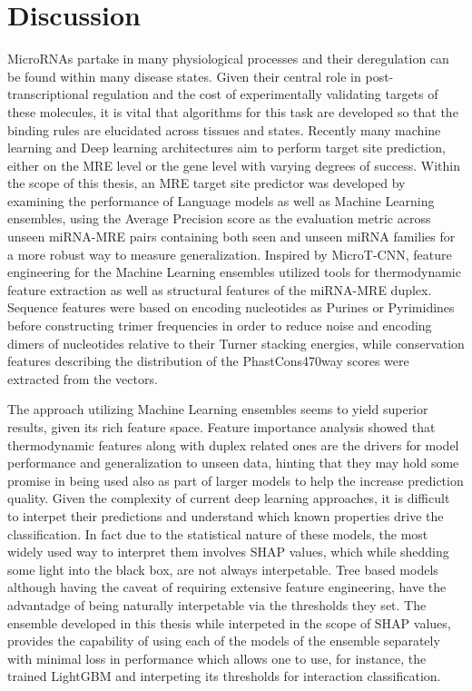 \documentclass[en,ack]{dimscthesis}
\begin{document}
\chapter{Discussion}
\par MicroRNAs partake in many physiological processes and their deregulation can be found within many disease states. Given their central role in post-transcriptional regulation and the cost of experimentally validating targets of these molecules, it is vital that algorithms for this task are developed so that the binding rules are elucidated across tissues and states. Recently many machine learning and Deep learning architectures aim to perform target site prediction, either on the MRE level or the gene level with varying degrees of success. Within the scope of this thesis, an MRE target site predictor was developed by examining the performance of Language models as well as Machine Learning ensembles, using the Average Precision score as the evaluation metric across unseen miRNA-MRE pairs containing both seen and unseen miRNA families for a more robust way to measure generalization. Inspired by MicroT-CNN, feature engineering for the Machine Learning ensembles utilized tools for thermodynamic feature extraction as well as structural features of the miRNA-MRE duplex. Sequence features were based on encoding nucleotides as Purines or Pyrimidines before constructing trimer frequencies in order to reduce noise and encoding dimers of nucleotides relative to their Turner stacking energies, while conservation features describing the distribution of the PhastCons470way scores were extracted from the vectors. 

The approach utilizing Machine Learning ensembles seems to yield superior results, given its rich feature space. Feature importance analysis showed that thermodynamic features along with duplex related ones are the drivers for model performance and generalization to unseen data, hinting that they may hold some promise in being used also as part of larger models to help the increase prediction quality. Given the complexity of current deep learning approaches, it is difficult to interpet their predictions and understand which known properties drive the classification. In fact due to the statistical nature of these models, the most widely used way to interpret them involves SHAP values, which while shedding some light into the black box, are not always interpetable. Tree based models although having the caveat of requiring extensive feature engineering, have the advantadge of being naturally interpetable via the thresholds they set. The ensemble developed in this thesis while interpeted in the scope of SHAP values, provides the capability of using each of the models of the ensemble separately with minimal loss in performance which allows one to use, for instance, the trained LightGBM and interpeting its thresholds for interaction classification.
\end{document}
